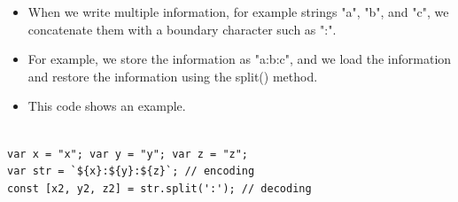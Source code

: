 \begin{frame}[fragile]{}

\begin{itemize}
	\item When we write multiple information, for example strings "a", "b", and "c", we concatenate them with a boundary character such as ":".
	\item For example, we store the information as "a:b:c", and we load the information and restore the information using the split() method. 
	\item This code shows an example. 
\end{itemize}

\begin{Code}{}%
\begin{lstlisting}[firstnumber=1, label=glabels, xleftmargin=0pt, basicstyle=\scriptsize]% 

var x = "x"; var y = "y"; var z = "z";
var str = `${x}:${y}:${z}`; // encoding
const [x2, y2, z2] = str.split(':'); // decoding
\end{lstlisting}%
\end{Code}%

\end{frame}